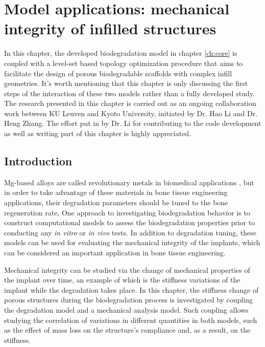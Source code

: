 \chapter{Model applications: mechanical integrity of infilled structures}\label{ch:infill}

In this chapter, the developed biodegradation model in chapter \ref{ch:core} is coupled with a level-set based topology optimization procedure that aims to facilitate the design of porous biodegradable scaffolds with complex infill geometries. It's worth mentioning that this chapter is only discussing the first steps of the interaction of these two models rather than a fully developed study. The research presented in this chapter is carried out as an ongoing collaboration work between KU Leuven and Kyoto University, initiated by Dr. Hao Li and Dr. Heng Zhang. The effort put in by Dr. Li for contributing to the code development as well as writing part of this chapter is highly appreciated.

\section{Introduction}

Mg-based alloys are called revolutionary metals in biomedical applications \cite{Shuai2019}, but in order to take advantage of these materials in bone tissue engineering applications, their degradation parameters should be tuned to the bone regeneration rate. One approach to investigating biodegradation behavior is to construct computational models to assess the biodegradation properties prior to conducting any \textit{in vitro} or \textit{in vivo} tests. In addition to degradation tuning, these models can be used for evaluating the mechanical integrity of the implants, which can be considered an important application in bone tissue engineering. 

Mechanical integrity can be studied via the change of mechanical properties of the implant over time, an example of which is the stiffness variations of the implant while the degradation takes place. In this chapter, the stiffness change of porous structures during the biodegradation process is investigated by coupling the degradation model and a mechanical analysis model. Such coupling allows studying the correlation of variations in different quantities in both models, such as the effect of mass loss on the structure's compliance and, as a result, on the stiffness. 


